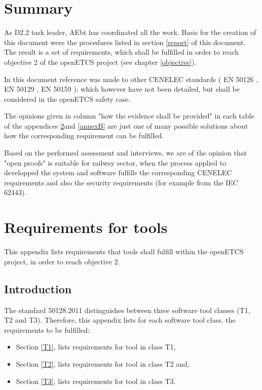 \documentclass{template/openetcs_report}
\begin{document}
\chapter{Summary}
As D2.2 task leader, AEbt has coordinated all the work. Basis for the creation of this document were the procedures listed in section \ref{report} of this document. The result is a set of requirements, which shall be fulfilled in order to reach objective 2 of the openETCS project (see chapter \ref{objective}). 

In this document reference was made to other CENELEC standards ( EN 50126 \cite{EN50126}, EN 50129 \cite{EN50129}, EN 50159 \cite{EN50159}); which however have not been detailed, but shall be considered in the openETCS safety case.

The opinions given in column "how the evidence shall be provided" in each table of the appendices \ref{annexA}and \ref{annexB} are just one of many possible solutions about how the corresponding requirement can be fulfilled.

Based on the performed assessment and interviews, we are of the opinion that "open proofs" is suitable for railway sector, when the process applied to developped the system and software fulfills the corresponding CENELEC requirements and also the security requirements (for example from the IEC 62443).



\nocite{*}




\appendix

\chapter{Requirements for tools}
\label{annexA}
This appendix lists requirements that tools shall fulfill within the openETCS project, in order to reach objective 2.

\section{Introduction}
The standard 50128:2011 distinguishes between three software tool classes (T1, T2 and T3). Therefore, this appendix  lists for each software tool class, the requirements to be fulfilled:
\begin{itemize}\itemsep=0pt
  \item Section \ref{T1}, lists requirements for tool in class T1,
  \item Section \ref{T2}, lists requirements for tool in class T2 and,
  \item Section \ref{T3}, lists requirements for tool in class T3.
\end{itemize}
\end{document}
